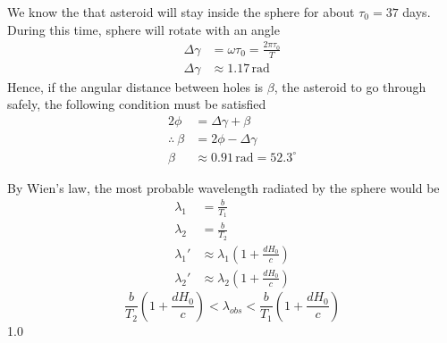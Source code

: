 \begin{description}
  We know the that asteroid will stay inside the sphere for about
  $\tau_0 = 37$ days. During this time, sphere will rotate with an angle
  \begin{align*}
  \Delta\gamma &= \omega\tau_0 = \frac{2\pi\tau_0}{T}\\
  \Delta\gamma &\approx 1.17\,\mathrm{rad}
    \tag*{2.0}
  \end{align*}
  Hence, if the angular distance between holes is $\beta$, the asteroid to
  go through safely, the following condition must be satisfied
  \begin{align*}
  2\phi &= \Delta\gamma + \beta
    \tag*{5.0}\\
  \therefore\ \beta &= 2\phi - \Delta\gamma\\
  \beta &\approx 0.91\,\mathrm{rad} = 52.3^\circ
    \tag*{1.0}
  \end{align*}
\item[(i)] By Wien's law, the most probable wavelength radiated by the
  sphere would be
  \begin{align*}
  \lambda_1 &= \frac{b}{T_1}\\
  \lambda_2 &= \frac{b}{T_2}
    \tag*{2.0}\\
  \lambda_1' &\approx \lambda_1\left(1+\frac{dH_0}{c}\right)\\
  \lambda_2' &\approx \lambda_2\left(1+\frac{dH_0}{c}\right)
    \tag*{2.0}
  \end{align*}
  \[ \frac{b}{T_2}\left(1+\frac{dH_0}{c}\right) < \lambda_{obs}
     < \frac{b}{T_1}\left(1+\frac{dH_0}{c}\right) \]
  \hfill 1.0
\end{description}

